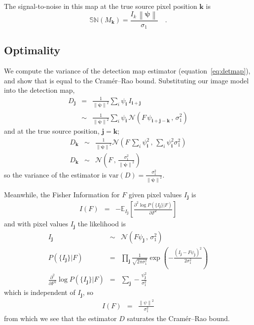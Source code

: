 \documentclass[11pt,letterpaper,linenumbers]{aastex63}
\newcommand{\equationname}{equation}
\newcommand{\eqnref}[1]{\mbox{\equationname~\ref{#1}}}
\newcommand{\drawnfrom}{\sim}
\newcommand{\gaussianN}{\mathcal{N}}
\newcommand{\gaussx}[2]{\gaussianN\!\left(#1 \, , \, #2\right)}
\newcommand{\psf}{\psi}
\newcommand{\psfat}[1]{\psf_{#1}}
\newcommand{\psfnorm}{\norm{\bm{\psf}}}
\newcommand{\snr}[1]{\mathbb{SN}(#1)}
\newcommand{\norm}[1]{\left\lVert #1 \right\rVert}
\newcommand{\var}[1]{\mathrm{var}\left( #1 \right)}
\renewcommand{\vec}[1]{\boldsymbol{#1}}
\newcommand{\ivec}{\vec{i}}
\newcommand{\jvec}{\vec{j}}
\newcommand{\kvec}{\vec{k}}
\begin{document}
The signal-to-noise in this map at the true source pixel
position $\kvec$ is
\begin{equation}
\snr{M_{\kvec}} = \frac{I_k \, \norm{\bm{\psfat{}}}}{\sigma_1} \quad .
\end{equation}


\subsection{Optimality}
\label{sec:optsingle}

We compute the variance of the detection map estimator
(\eqnref{eq:detmap}), and show that is equal to the Cram\'er--Rao
bound.  Substituting our image model into the detection map,
\begin{eqnarray}
D_{\jvec} &=& \frac{1}{\psfnorm^2} \sum_{i} \psfat{\ivec} \,
I_{\ivec + \jvec}
\\
& \drawnfrom & \frac{1}{\psfnorm^2} \sum_{i} \psfat{\ivec} \,
\gaussx{F \, \psfat{\ivec + \jvec - \kvec}}{\sigma_1^2}
\end{eqnarray}
and at the true source position, $\jvec = \kvec$;
\begin{eqnarray}
%
D_{\kvec} &\drawnfrom& \frac{1}{\psfnorm^2} \gaussx%
{F \, \sum_{i} \psfat{\ivec}^2}%
{\sum_{i} \psfat{\ivec}^2 \sigma_1^2}
\\
D_{\kvec} &\drawnfrom& \gaussx%
{F}{\frac{\sigma_1^2}{\psfnorm^2}}
\end{eqnarray}
so the variance of the estimator is $\var{D} = \frac{\sigma_1^2}{\psfnorm^2}$.

Meanwhile, the Fisher Information for $F$ given pixel values $I_{\jvec}$ is
\begin{eqnarray}
  I(F) &=& -\mathbb{E}_{I_{\jvec}} \left[ \frac{\partial^2 \log P(\{ I_{\jvec} \} | F)}{\partial F^2} \right]
\end{eqnarray}
and with pixel values $I_{\jvec}$ the likelihood is
\begin{eqnarray}
  I_{\jvec} &\drawnfrom& \gaussx{F \psf_{\jvec}}{\sigma_1^2} \\
  P(\{ I_{\jvec} \} | F) &=& \prod_{\jvec} \frac{1}{\sqrt{2 \pi \sigma_1^2}} \exp \left( -\frac{(I_{\jvec} - F \psf_{\jvec})^2}{2 \sigma_1^2} \right) \\
  \frac{\partial^2}{\partial F^2} \log P(\{ I_{\jvec} \} | F) &=& \sum_{\jvec} -\frac{\psf_{\jvec}^2}{\sigma_1^2}
\end{eqnarray}
which is independent of $I_{\jvec}$, so
\begin{eqnarray}
  I(F) &=& \frac{\norm{\psf}^2}{\sigma_1^2}
\end{eqnarray}
from which we see that the estimator $D$ saturates the Cram\'er--Rao bound.
\end{document}
